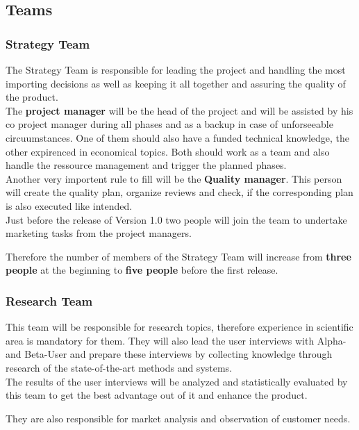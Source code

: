 \documentclass[a4paper,11pt]{article}
\begin{document}
\subsection{Teams}
\subsubsection{Strategy Team}
The Strategy Team is responsible for leading the project and handling the most importing decisions as well as keeping it all together and assuring the quality of the product. \\

The \textbf{project manager} will be the head of the project and will be assisted by his co project manager during all phases and as a backup in case of unforseeable circuumstances. One of them should also have a funded technical knowledge, the other expirenced in economical topics. Both should work as a team and also handle the ressource management and trigger the planned phases. \\

Another very importent rule to fill will be the \textbf{Quality manager}. This person will create the quality plan, organize reviews and check, if the corresponding plan is also executed like intended. \\

Just before the release of Version 1.0 two people will join the team to undertake marketing tasks from the project managers.

Therefore the number of members of the Strategy Team will increase from \textbf{three people} at the beginning to \textbf{five people} before the first release.

\subsubsection{Research Team}
This team will be responsible for research topics, therefore experience in scientific area is mandatory for them. They will also lead the user interviews with Alpha- and Beta-User and prepare these interviews by collecting knowledge through research of the state-of-the-art methods and systems. \\

The results of the user interviews will be analyzed and statistically evaluated by this team to get the best advantage out of it and enhance the product.

They are also responsible for market analysis and observation of customer needs. \\
\end{document}
